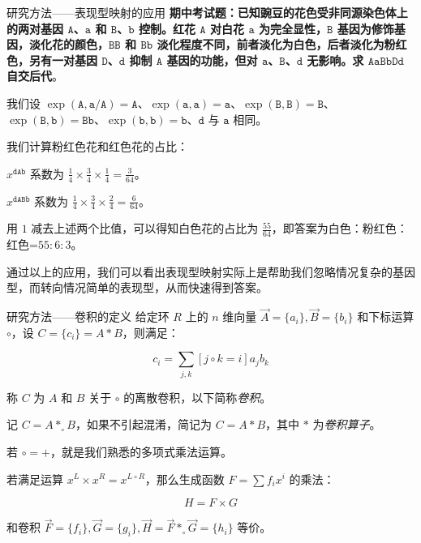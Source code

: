 \documentclass[10pt,aspectratio=43,mathserif]{ctexbeamer}
\begin{document}
	\begin{frame}{研究方法——表现型映射的应用}
		\textbf{期中考试题：已知豌豆的花色受非同源染色体上的两对基因 $\texttt{A}$、$\texttt{a}$ 和 $\texttt{B}$、$\texttt{b}$ 控制。红花 $\texttt{A}$ 对白花 $\texttt{a}$ 为完全显性，$\texttt{B}$ 基因为修饰基因，淡化花的颜色，$\texttt{BB}$ 和 $\texttt{Bb}$ 淡化程度不同，前者淡化为白色，后者淡化为粉红色，另有一对基因 $\texttt{D}$、$\texttt{d}$ 抑制 $\texttt{A}$ 基因的功能，但对 $\texttt{a}$、$\texttt{B}$、$\texttt{d}$ 无影响。求 $\texttt{AaBbDd}$ 自交后代}。
		
		我们设 $\operatorname{exp}(\texttt{A},\texttt{a}/\texttt{A})=\texttt{A}$、$\operatorname{exp}(\texttt{a},\texttt{a})=\texttt{a}$、$\operatorname{exp}(\texttt{B},\texttt{B})=\texttt{B}$、$\operatorname{exp}(\texttt{B},\texttt{b})=\texttt{Bb}$、$\operatorname{exp}(\texttt{b},\texttt{b})=\texttt{b}$、$\texttt{d}$ 与 $\texttt{a}$ 相同。
		
		我们计算粉红色花和红色花的占比：
		
		$x^{\texttt{dAb}}$ 系数为 $\frac{1}{4} \times \frac{3}{4} \times \frac{1}{4}=\frac{3}{64}$。
		
		$x^{\texttt{dABb}}$ 系数为 $\frac{1}{4} \times \frac{3}{4} \times \frac{2}{4}=\frac{6}{64}$。
		
		用 $1$ 减去上述两个比值，可以得知白色花的占比为 $\frac{55}{64}$，即答案为白色：粉红色：红色=$55:6:3$。
		
		通过以上的应用，我们可以看出表现型映射实际上是帮助我们忽略情况复杂的基因型，而转向情况简单的表现型，从而快速得到答案。
	\end{frame}

	\begin{frame}{研究方法——卷积的定义}
		给定环 $R$ 上的 $n$ 维向量 $\vec A=\{a_i\},\vec B=\{b_i\}$ 和下标运算 $\circ$，设 $C=\{c_i\}=A*B$，则满足：
		
		\begin{equation*}
			c_i=\sum_{j,k} [j \circ k=i] a_jb_k
		\end{equation*}
		
		称 $C$ 为 $A$ 和 $B$ 关于 $\circ$ 的离散卷积，以下简称\textsl{卷积}。
		
		记 $C=A*_{\circ}B$，如果不引起混淆，简记为 $C=A*B$，其中 $*$ 为\textsl{卷积算子}。
		
		若 $\circ = +$，就是我们熟悉的多项式乘法运算。
		
		若满足运算 $x^L \times x^R = x^{L \circ R}$，那么生成函数 $F=\sum f_i x^i$ 的乘法：
		
		$$H=F \times G$$
		
		和卷积 $\vec F=\{f_i\},\vec G=\{g_i\},\vec H=\vec F *_{\circ} \vec G=\{h_i\}$ 等价。
	\end{frame}
\end{document}
